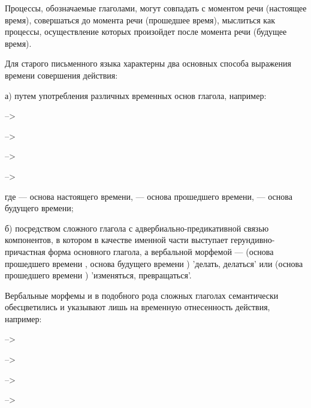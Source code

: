 Процессы, обозначаемые глаголами, могут совпадать с моментом речи (настоящее время), совершаться до момента речи (прошедшее время), мыслиться как процессы, осуществление которых произойдет после момента речи (будущее время).

Для старого письменного языка характерны два основных способа выражения времени совершения действия:

а) путем употребления различных временных основ глагола, например:

\begin{description}
\item{} -->
\item-->
\item-->
\item-->
\end{description}

где	 --- основа настоящего времени,  --- основа прошедшего времени,  --- основа будущего времени;

б) посредством сложного глагола с адвербиально-предикативной связью компонентов, в котором в качестве именной части выступает герундивно-причастная форма основного
глагола, а вербальной морфемой ---  (основа прошедшего времени , основа будущего времени ) 'делать, делаться' или	 (основа прошедшего времени ) 'изменяться, превращаться'.

Вербальные морфемы  и  в подобного рода сложных глаголах семантически обесцветились и указывают лишь на временную отнесенность действия, например:

\begin{description}
	\item{}-->
	\item-->
	\item-->
	\item-->
\end{description}

